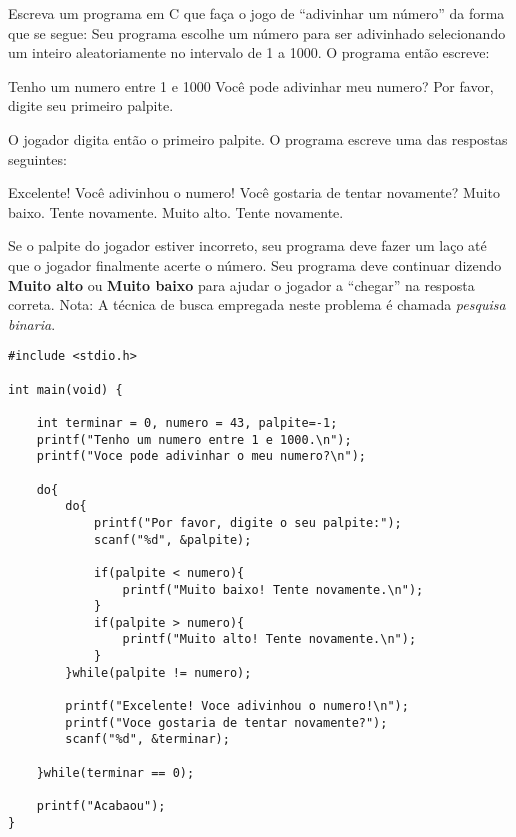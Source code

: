 
\question[10]

Escreva um programa em C que faça o jogo de ``adivinhar um número'' da forma que se segue: Seu programa escolhe um número para ser adivinhado selecionando um inteiro aleatoriamente no intervalo de 1 a 1000. O programa então escreve:

\begin{exemplo}{}{}
Tenho um numero entre 1 e 1000 \newline
Você pode adivinhar meu numero? \newline 
Por favor, digite seu primeiro palpite. 
\end{exemplo}

O jogador digita então o primeiro palpite. O programa escreve uma das respostas seguintes:

\begin{exemplo}{}{}
	Excelente! Você adivinhou o numero! Você gostaria de tentar novamente? \newline
	Muito baixo. Tente novamente. \newline
	Muito alto. Tente novamente.
\end{exemplo}

Se o palpite do jogador estiver incorreto, seu programa deve fazer um laço até que o jogador finalmente acerte o número. Seu programa deve continuar dizendo \textbf{Muito alto} ou \textbf{Muito baixo} para ajudar o jogador a ``chegar'' na resposta correta. Nota: A técnica de busca empregada neste problema é chamada \textit{pesquisa binaria}.

\begin{solution}
\begin{lstlisting}
#include <stdio.h>

int main(void) {

	int terminar = 0, numero = 43, palpite=-1;
	printf("Tenho um numero entre 1 e 1000.\n");
	printf("Voce pode adivinhar o meu numero?\n");
	
	do{
		do{
			printf("Por favor, digite o seu palpite:");
			scanf("%d", &palpite);
			
			if(palpite < numero){
				printf("Muito baixo! Tente novamente.\n");
			}
			if(palpite > numero){
				printf("Muito alto! Tente novamente.\n");
			}
		}while(palpite != numero);
		
		printf("Excelente! Voce adivinhou o numero!\n");
		printf("Voce gostaria de tentar novamente?");
		scanf("%d", &terminar);
	
	}while(terminar == 0);
	
	printf("Acabaou");
}
\end{lstlisting}
\end{solution}